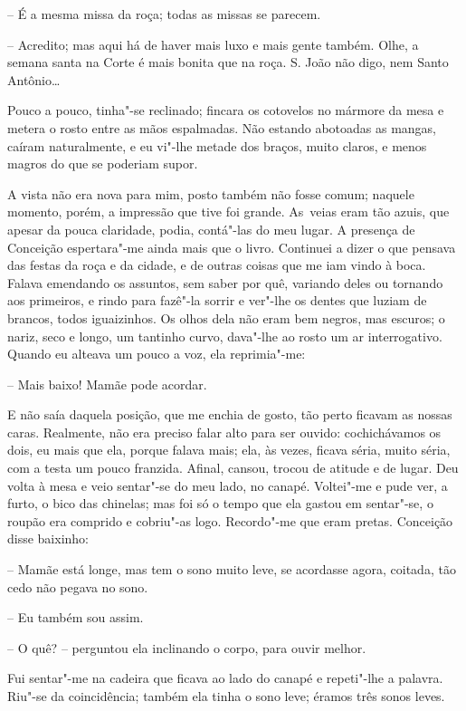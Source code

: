 -- É a mesma missa da roça; todas as missas se parecem.

-- Acredito; mas aqui há de haver mais luxo e mais gente também. Olhe, a
semana santa na Corte é mais bonita que na roça. S. João não digo, nem
Santo Antônio\ldots{}

Pouco a pouco, tinha"-se reclinado; fincara os cotovelos no mármore da
mesa e metera o rosto entre as mãos espalmadas. Não estando abotoadas as
mangas, caíram naturalmente, e eu vi"-lhe metade dos braços, muito
claros, e menos magros do que se poderiam supor.

A vista não era nova para mim, posto também não fosse comum; naquele
momento, porém, a impressão que tive foi grande. As~veias eram tão
azuis, que apesar da pouca claridade, podia, contá"-las do meu lugar. A
presença de Conceição espertara"-me ainda mais que o livro. Continuei a
dizer o que pensava das festas da roça e da cidade, e de outras coisas
que me iam vindo à boca. Falava emendando os assuntos, sem saber por
quê, variando deles ou tornando aos primeiros, e rindo para fazê"-la
sorrir e ver"-lhe os dentes que luziam de brancos, todos iguaizinhos. Os
olhos dela não eram bem negros, mas escuros; o nariz, seco e longo, um
tantinho curvo, dava"-lhe ao rosto um ar interrogativo. Quando eu alteava
um pouco a voz, ela reprimia"-me:

-- Mais baixo! Mamãe pode acordar.

E não saía daquela posição, que me enchia de gosto, tão perto ficavam as
nossas caras. Realmente, não era preciso falar alto para ser ouvido:
cochichávamos os dois, eu mais que ela, porque falava mais; ela, às
vezes, ficava séria, muito séria, com a testa um pouco franzida. Afinal,
cansou, trocou de atitude e de lugar. Deu volta à mesa e veio sentar"-se
do meu lado, no canapé. Voltei"-me e pude ver, a furto, o bico das
chinelas; mas foi só o tempo que ela gastou em sentar"-se, o roupão era
comprido e cobriu"-as logo. Recordo"-me que eram pretas. Conceição disse
baixinho:

-- Mamãe está longe, mas tem o sono muito leve, se acordasse agora,
coitada, tão cedo não pegava no sono.

-- Eu também sou assim.

-- O quê? -- perguntou ela inclinando o corpo, para ouvir melhor.

Fui sentar"-me na cadeira que ficava ao lado do canapé e repeti"-lhe a
palavra. Riu"-se da coincidência; também ela tinha o sono leve; éramos
três sonos leves.

